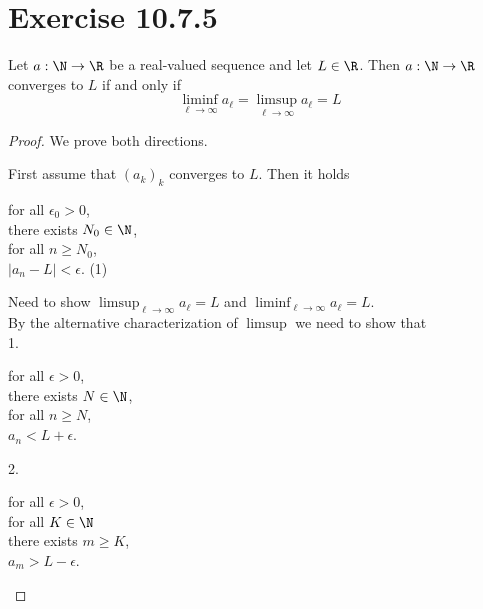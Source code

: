 \documentclass{assignment}
\begin{document}
    \section{Exercise 10.7.5}
    \begin{problem}
        Let $a: \N \to \R$ be a real-valued sequence and let $L \in \R$. Then $a: \N \to \R$ converges to $L$ if and only if
        $$\liminf_{\ell \to \infty}a_\ell = \limsup_{\ell\to\infty}a_\ell = L$$
    \end{problem}
    \begin{proof}[Proof]
        We prove both directions.

        First assume that $(a_k)_k$ converges to $L$.
        Then it holds
        \begin{center}
            \parbox{\linewidth}{
                \linewidth
                for all $\epsilon_0 > 0$, \\
                \hspace*{1em} there exists $N_0 \in \N$, \\
                \hspace*{2em} for all $n \ge N_0$, \\
                \hspace*{3em} $|a_n - L| < \epsilon$.
                \hfill (1)
            }
        \end{center}
        Need to show $\limsup_{\ell\to\infty}a_\ell = L$ and $\liminf_{\ell\to\infty}a_\ell = L$. \\
        By the alternative characterization of $\limsup$ we need to show that \\
        1. \begin{center}
            \parbox{\linewidth}{
                \linewidth
                for all $\epsilon > 0$, \\
                \hspace*{1em} there exists $N \in \N$, \\
                \hspace*{2em} for all $n \ge N$, \\
                \hspace*{3em} $a_n < L + \epsilon$.
            }
        \end{center}
        2. \begin{center}
            \parbox{\linewidth}{
                \linewidth
                for all $\epsilon > 0$, \\
                \hspace*{1em} for all $K \in \N$ \\
                \hspace*{2em} there exists $m \ge K$, \\
                \hspace*{3em} $a_m > L - \epsilon$.
            }
        \end{center}


\end{proof}
\end{document}
